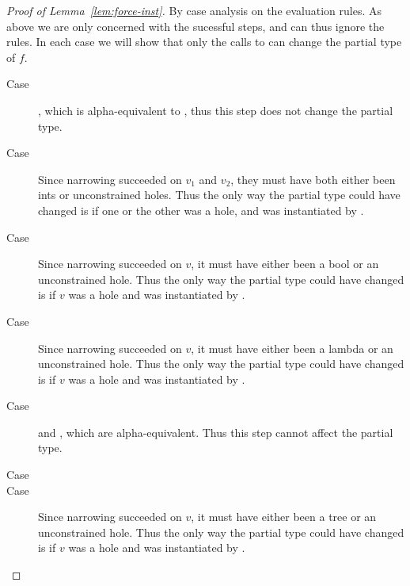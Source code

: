 \begin{proof}[Proof of Lemma~\ref{lem:force-inst}]
  By case analysis on the evaluation rules. As above we are only
  concerned with the sucessful steps, and can thus ignore the
   rules. In each case we will show that only
  the calls to \forcesym can change the partial type of $f$.

  \begin{description}
  \item[Case \reholegood] \hastype{\ehole}{\thole}, which is
    alpha-equivalent to \typeof{\vhole{\thole}}, thus this step does not
    change the partial type.
  \item[Case \replusgood] Since narrowing succeeded on $v_1$ and $v_2$,
    they must have both either been ints or unconstrained holes. Thus
    the only way the partial type could have changed is if one or the
    other was a hole, and was instantiated by \forcesym.
  \item[Case ] Since narrowing succeeded on
    $v$, it must have either been a bool or an unconstrained hole. Thus
    the only way the partial type could have changed is if $v$ was a
    hole and was instantiated by \forcesym.
  \item[Case \reappgood] Since narrowing succeeded on $v$, it must have
    either been a lambda or an unconstrained hole. Thus the only way the
    partial type could have changed is if $v$ was a hole and was
    instantiated by \forcesym.
  \item[Case \releafgood] \hastype{\eleaf}{\ttree{\thole}} and
    \hastype{\vleaf{\thole}}{\ttree{\thole}}, which are
    alpha-equivalent. Thus this step cannot affect the partial type.
  \item[Case \renodegood] 
  \item[Case ] Since narrowing succeeded on
    $v$, it must have either been a tree or an unconstrained hole. Thus
    the only way the partial type could have changed is if $v$ was a
    hole and was instantiated by \forcesym.
  \end{description}
\end{proof}

